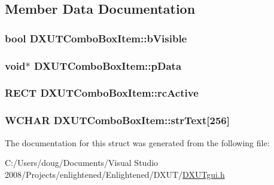 \subsection{Member Data Documentation}
\hypertarget{struct_d_x_u_t_combo_box_item_a1eb68d408cc0c561ecbcb86648bfef62}{
\subsubsection[{bVisible}]{\setlength{\rightskip}{0pt plus 5cm}bool {\bf DXUTComboBoxItem::bVisible}}}
\label{struct_d_x_u_t_combo_box_item_a1eb68d408cc0c561ecbcb86648bfef62}
\hypertarget{struct_d_x_u_t_combo_box_item_a62ebde50a72cf8b28aaedab5f942fc13}{
\subsubsection[{pData}]{\setlength{\rightskip}{0pt plus 5cm}void$\ast$ {\bf DXUTComboBoxItem::pData}}}
\label{struct_d_x_u_t_combo_box_item_a62ebde50a72cf8b28aaedab5f942fc13}
\hypertarget{struct_d_x_u_t_combo_box_item_a805429e07edf6e00edaab721af4fdc95}{
\subsubsection[{rcActive}]{\setlength{\rightskip}{0pt plus 5cm}RECT {\bf DXUTComboBoxItem::rcActive}}}
\label{struct_d_x_u_t_combo_box_item_a805429e07edf6e00edaab721af4fdc95}
\hypertarget{struct_d_x_u_t_combo_box_item_add4f4ff25c0414b3b9c11425f54739a2}{
\subsubsection[{strText}]{\setlength{\rightskip}{0pt plus 5cm}WCHAR {\bf DXUTComboBoxItem::strText}\mbox{[}256\mbox{]}}}
\label{struct_d_x_u_t_combo_box_item_add4f4ff25c0414b3b9c11425f54739a2}


The documentation for this struct was generated from the following file:\begin{DoxyCompactItemize}
\item 
C:/Users/doug/Documents/Visual Studio 2008/Projects/enlightened/Enlightened/DXUT/\hyperlink{_d_x_u_tgui_8h}{DXUTgui.h}\end{DoxyCompactItemize}
